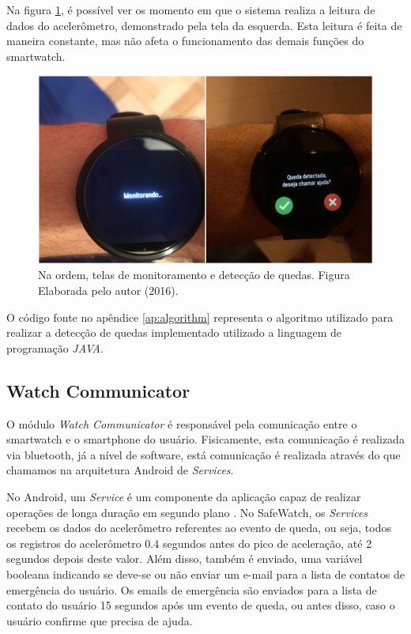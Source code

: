  
 
 Na figura \ref{fig:smartwatch_screen}, é possível ver os momento em que o sistema realiza a leitura de dados do acelerômetro, demonstrado pela tela da esquerda. Esta leitura é feita de maneira constante, mas não afeta o funcionamento das demais funções do smartwatch. 
 

 
 \begin{figure}[ht]
 	\centering
 	\includegraphics[scale=0.3]{imagens/smartwatch.png}
 	\caption{Na ordem, telas de monitoramento e detecção de quedas. Figura Elaborada pelo autor (2016).}
 	\label{fig:smartwatch_screen}
 \end{figure}
 
 O código fonte no apêndice \ref{ap:algorithm} representa o algoritmo utilizado para realizar a detecção de quedas implementado utilizado a linguagem de programação \textit{JAVA}. 

\subsection{Watch Communicator}
O módulo \textit{Watch Communicator} é responsável pela comunicação entre o smartwatch e o smartphone do usuário. Fisicamente, esta comunicação é realizada via bluetooth, já a nível de software, está comunicação é realizada através do que chamamos na arquitetura Android de \textit{Services}.

No Android, um \textit{Service} é um componente da aplicação capaz de realizar operações de longa duração em segundo plano \cite{servicesAndroidDocs}. No SafeWatch, os \textit{Services} recebem os dados do acelerômetro referentes ao evento de queda, ou seja, todos os registros do acelerômetro 0.4 segundos antes do pico de aceleração, até 2 segundos depois deste valor. Além disso, também é enviado, uma variável booleana indicando se deve-se ou não enviar um e-mail para a lista de contatos de emergência do usuário. Os emails de emergência são enviados para a lista de contato do usuário 15 segundos após um evento de queda, ou antes disso, caso o usuário confirme que precisa de ajuda. 

